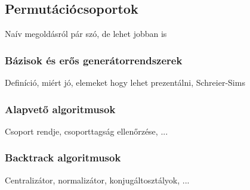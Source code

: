 \subsection{Permutációcsoportok}
\label{subsec:permutacio}
Naív megoldásról pár szó, de lehet jobban is

\subsubsection{Bázisok és erős generátorrendszerek}
Definíció, miért jó, elemeket hogy lehet prezentálni, Schreier-Sims

\subsubsection{Alapvető algoritmusok}
Csoport rendje, csoporttagság ellenőrzése, ...

\subsubsection{Backtrack algoritmusok}
Centralizátor, normalizátor, konjugáltosztályok, ...
